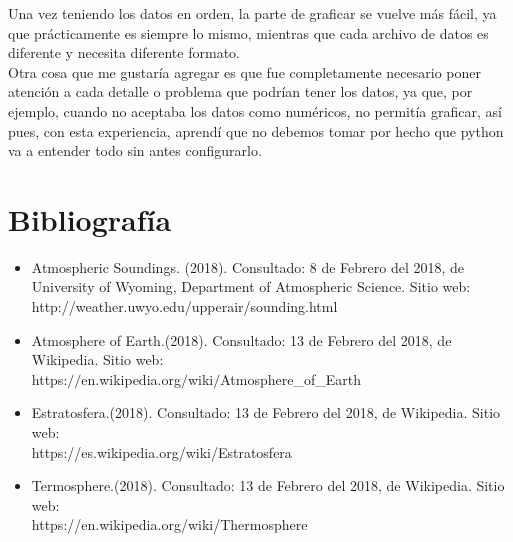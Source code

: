 \documentclass[a4paper]{article}
\begin{document}
Una vez teniendo los datos en orden, la parte de graficar se vuelve más fácil, ya que prácticamente es siempre lo mismo, mientras que cada archivo de datos es diferente y necesita diferente formato.\\

Otra cosa que me gustaría agregar es que fue completamente necesario poner atención a cada detalle o problema que podrían tener los datos, ya que, por ejemplo, cuando no aceptaba los datos como numéricos, no permitía graficar, así pues, con esta experiencia, aprendí que no debemos tomar por hecho que python va a entender todo sin antes configurarlo. 

\section{Bibliografía}

\begin{itemize}
\item Atmospheric Soundings. (2018). Consultado: 8 de Febrero del 2018, de University of Wyoming, Department of Atmospheric Science. Sitio web:  \\
http://weather.uwyo.edu/upperair/sounding.html
\item Atmosphere of Earth.(2018). Consultado: 13 de Febrero del 2018, de Wikipedia. Sitio web: \\
https:$//$en.wikipedia.org$/$wiki$/$Atmosphere\_of\_Earth
\item Estratosfera.(2018). Consultado: 13 de Febrero del 2018, de Wikipedia. Sitio web: \\
https://es.wikipedia.org/wiki/Estratosfera 
\item Termosphere.(2018). Consultado: 13 de Febrero del 2018, de Wikipedia. Sitio web: \\
https://en.wikipedia.org/wiki/Thermosphere
\end{itemize}
\end{document}
